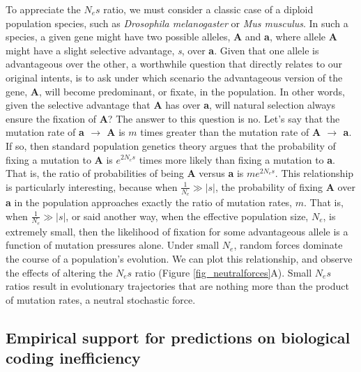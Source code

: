 \documentclass[twocolumn]{article}
\begin{document}
To appreciate the $N_es$ ratio, we must consider a classic case of a diploid population species, such as \textit{Drosophila melanogaster} or \textit{Mus musculus}. In such a species, a given gene might have two possible alleles, \textbf{A} and \textbf{a}, where allele \textbf{A} might have a slight selective advantage, \textit{s}, over \textbf{a}. Given that one allele is advantageous over the other, a worthwhile question that directly relates to our original intents, is to ask under which scenario the advantageous version of the gene, \textbf{A}, will become predominant, or fixate, in the population. In other words, given the selective advantage that \textbf{A} has over \textbf{a}, will natural selection always ensure the fixation of \textbf{A}? The answer to this question is no. Let's say that the mutation rate of \textbf{a $\rightarrow$ A} is $m$ times greater than the mutation rate of \textbf{A $\rightarrow$ a}. If so, then standard population genetics theory\cite{kimura1983neutral, guy_hirsh_2005, Lynch_2007, lynch_hagner_2015, lynch_2020} argues that the probability of fixing a mutation to \textbf{A} is $e^{2N_es}$ times more likely than fixing a mutation to \textbf{a}. That is, the ratio of probabilities of being \textbf{A} versus \textbf{a} is $me^{2N_es}$. This relationship is particularly interesting, because when $\frac{1}{N_e} \gg |s|$, the probability of fixing \textbf{A} over \textbf{a} in the population approaches exactly the ratio of mutation rates, $m$. That is, when $\frac{1}{N_e} \gg |s|$, or said another way, when the effective population size, $N_e$, is extremely small, then the likelihood of fixation for some advantageous allele is a function of mutation pressures alone. Under small $N_e$, random forces dominate the course of a population's evolution. We can plot this relationship, and observe the effects of altering the $N_es$ ratio (Figure \ref{fig_neutralforces}A). Small $N_es$ ratios result in evolutionary trajectories that are nothing more than the product of mutation rates, a neutral stochastic force. 

\subsection{Empirical support for predictions on biological coding inefficiency} \label{Empirical support for predictions on biological coding inefficiency}
\end{document}
